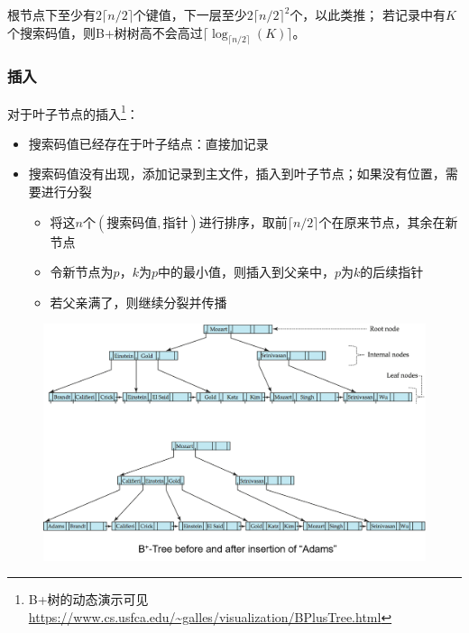 根节点下至少有$2\lceil n/2\rceil$个键值，下一层至少$2\lceil n/2\rceil^2$个，以此类推；
若记录中有$K$个搜索码值，则B+树树高不会高过$\lceil\log_{\lceil n/2\rceil}(K)\rceil$。


\subsubsection{插入}
对于叶子节点的插入\footnote{B+树的动态演示可见\url{https://www.cs.usfca.edu/~galles/visualization/BPlusTree.html}}：
\begin{itemize}
	\item 搜索码值已经存在于叶子结点：直接加记录
	\item 搜索码值没有出现，添加记录到主文件，插入到叶子节点；如果没有位置，需要进行分裂
	\begin{itemize}
		\item 将这$n$个$(\text{搜索码值},\text{指针})$进行排序，取前$\lceil n/2\rceil$个在原来节点，其余在新节点
		\item 令新节点为$p$，$k$为$p$中的最小值，则插入到父亲中，$p$为$k$的后续指针
		\item 若父亲满了，则继续分裂并传播
	\end{itemize}
\end{itemize}
\begin{figure}[H]
\centering
\includegraphics[width=0.8\linewidth]{fig/bp-tree_insertion.png}
\end{figure}

